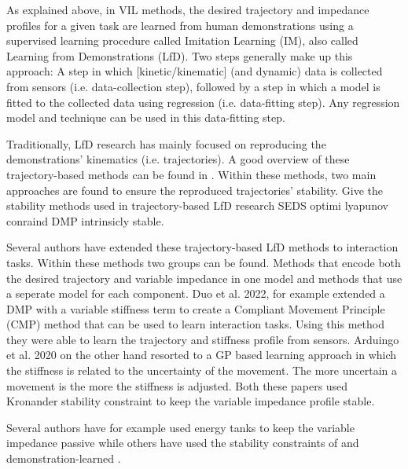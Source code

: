 As explained above, in VIL methods, the desired trajectory and impedance profiles for a given task are learned from human demonstrations using a supervised learning procedure called Imitation Learning (IM), also called Learning from Demonstrations (LfD). Two steps generally make up this approach: A step in which [kinetic/kinematic] (and dynamic) data is collected from sensors (i.e. data-collection step), followed by a step in which a model is fitted to the collected data using regression (i.e. data-fitting step). Any regression model and technique can be used in this data-fitting step.

Traditionally, LfD research has mainly focused on reproducing the demonstrations' kinematics (i.e. trajectories). A good overview of these trajectory-based methods can be found in \cite{siReviewManipulationSkill2021}. Within these methods, two main approaches are found to ensure the reproduced trajectories' stability.
Give the stability methods used in trajectory-based LfD research
SEDS optimi lyapunov conraind
DMP intrinsicly stable.

Several authors have extended these trajectory-based LfD methods to interaction tasks. Within these methods two groups can be found. Methods that encode both the desired trajectory and variable impedance in one model and methods that use a seperate model for each component.
Duo et al. 2022, for example \cite{douRobotSkillLearning2022} extended a DMP with a variable stiffness term to create a Compliant Movement Principle (CMP) method that can be used to learn interaction tasks. Using this method they were able to learn the trajectory and stiffness profile from sensors. Arduingo et al. 2020 on the other hand resorted to a GP based learning approach in which the stiffness is related to the uncertainty of the movement. The more uncertain a movement is the more the stiffness is adjusted. Both these papers used Kronander stability constraint to keep the variable impedance profile stable.

Several authors have for example used energy tanks to keep the variable impedance passive \cite{amanhoudForceAdaptationContact2020,enayatiVariableImpedanceForceControl2020,kastritsiProgressiveAutomationDMP2018,michelBilateralTeleoperationAdaptive2021,saverianoEnergybasedApproachEnsure2020,shahriariAdaptingContactsEnergy2017,wuFrameworkAutonomousImpedance2021,amanhoudDynamicalSystemApproach2019,kronanderPassiveInteractionControl2016} while others have used the stability constraints of and demonstration-learned \cite{arduengoGaussianProcessbasedRobotLearning2020,douRobotSkillLearning2022}.

